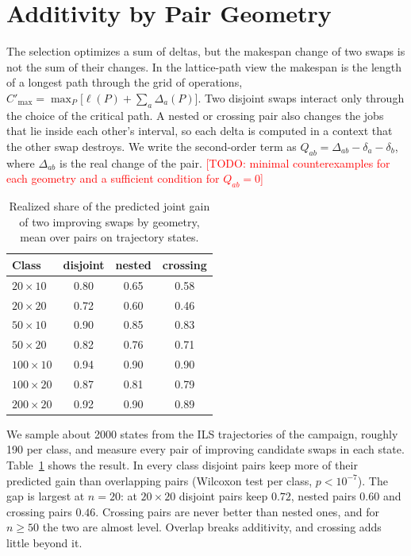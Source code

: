 \documentclass[10pt,twocolumn]{article}
\newcommand{\todo}[1]{\textcolor{red}{[TODO: #1]}}
\begin{document}
\section{Additivity by Pair Geometry}\label{sec:additivity}

The selection optimizes a sum of deltas, but the makespan change of two
swaps is not the sum of their changes. In the lattice-path view the
makespan is the length of a longest path through the grid of operations,
$C'_{\max}=\max_P\bigl[\ell(P)+\sum_a\Delta_a(P)\bigr]$. Two disjoint
swaps interact only through the choice of the critical path. A nested or
crossing pair also changes the jobs that lie inside each other's
interval, so each delta is computed in a context that the other swap
destroys. We write the second-order term as
$Q_{ab}=\Delta_{ab}-\delta_a-\delta_b$, where $\Delta_{ab}$ is the real
change of the pair. \todo{minimal counterexamples for each geometry and
a sufficient condition for $Q_{ab}=0$}

\begin{table}[t]
\centering
\caption{Realized share of the predicted joint gain of two improving
swaps by geometry, mean over pairs on trajectory states.}
\label{tab:geometry}
\small
\begin{tabular}{@{}lccc@{}}
\toprule
Class & disjoint & nested & crossing \\
\midrule
$20\times10$ & 0.80 & 0.65 & 0.58 \\
$20\times20$ & 0.72 & 0.60 & 0.46 \\
$50\times10$ & 0.90 & 0.85 & 0.83 \\
$50\times20$ & 0.82 & 0.76 & 0.71 \\
$100\times10$ & 0.94 & 0.90 & 0.90 \\
$100\times20$ & 0.87 & 0.81 & 0.79 \\
$200\times20$ & 0.92 & 0.90 & 0.89 \\
\bottomrule
\end{tabular}
\end{table}

We sample about 2000 states from the ILS trajectories of the campaign,
roughly 190 per class, and measure every pair of improving candidate
swaps in each state. Table~\ref{tab:geometry} shows the result. In every
class disjoint pairs keep more of their predicted gain than overlapping
pairs (Wilcoxon test per class, $p<10^{-7}$). The gap is largest at
$n=20$: at $20\times20$ disjoint pairs keep $0.72$, nested pairs $0.60$
and crossing pairs $0.46$. Crossing pairs are never better than nested
ones, and for $n\geq50$ the two are almost level. Overlap breaks
additivity, and crossing adds little beyond it.
\end{document}
